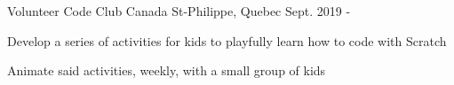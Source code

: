 

\begin{cventries}

  \cventry
    {Volunteer} %
    {Code Club Canada} %
    {St-Philippe, Quebec} %
    {Sept. 2019 - } %
    {
      \begin{cvitems} %
        \item {Develop a series of activities for kids to playfully learn how to code with Scratch}
        \item {Animate said activities, weekly, with a small group of kids}
      \end{cvitems}
    }

\end{cventries}
